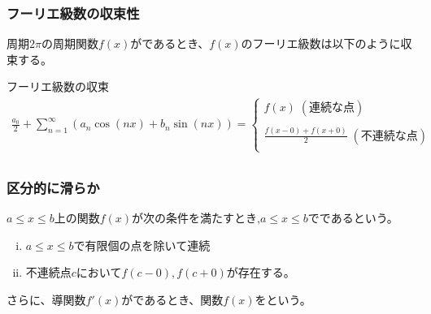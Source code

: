 \documentclass[a4paper]{jsarticle}
\begin{document}
\subsubsection{フーリエ級数の収束性}
周期$2\pi$の周期関数$f\left(x\right)$がであるとき、$f\left(x\right)$のフーリエ級数は以下のように収束する。
\begin{itembox}[l]{フーリエ級数の収束}
    \begin{eqnarray*}
        \frac{a_0}{2}+\sum^{\infty}_{n=1}\left(a_n\cos\left(nx\right)+b_n\sin\left(nx\right)\right) =
        \begin{cases}
            f\left(x\right) \; (連続な点)                                              \\
            \\
            \displaystyle\frac{f\left(x-0\right)+f\left(x+0\right)}{2} \; (不連続な点) \\
        \end{cases}\\
    \end{eqnarray*}
\end{itembox}
\subsubsection*{区分的に滑らか}
$a \leq x \leq b$上の関数$f\left(x\right)$が次の条件を満たすとき,$a \leq x \leq b$でであるという。
\begin{enumerate}[(i)]
    \item $a \leq x \leq b$で有限個の点を除いて連続
    \item 不連続点$c$において$f\left(c-0\right),f\left(c+0\right)$が存在する。
\end{enumerate}
さらに、導関数$f'\left(x\right)$がであるとき、関数$f\left(x\right)$をという。
\end{document}
